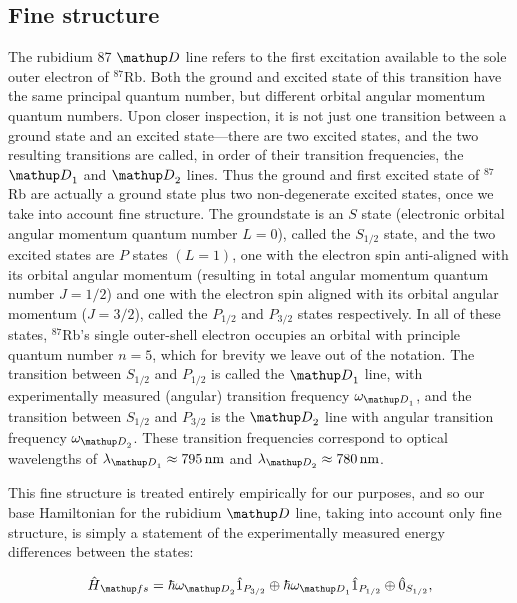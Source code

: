 \subsection{Fine structure}

The rubidium 87 $\up{D}$ line refers to the first excitation available to the sole outer electron of $^{87}$Rb. Both the ground and excited state of this transition have the same principal quantum number, but different orbital angular momentum quantum numbers. Upon closer inspection, it is not just one transition between a ground state and an excited state---there are two excited states, and the two resulting transitions are called, in order of their transition frequencies, the $\up{D}_1$ and  $\up{D}_2$ lines. Thus the ground and first excited state of $^{87}$Rb are actually a ground state plus two non-degenerate excited states, once we take into account fine structure. The groundstate is an $S$ state (electronic orbital angular momentum quantum number $L=0$), called the $S_{1/2}$ state, and the two excited states are $P$ states $(L=1)$, one with the electron spin anti-aligned with its orbital angular momentum (resulting in total angular momentum quantum number $J=1/2$) and one with the electron spin aligned with its orbital angular momentum ($J=3/2$), called the $P_{1/2}$ and $P_{3/2}$ states respectively. In all of these states, $^{87}$Rb's single outer-shell electron occupies an orbital with principle quantum number $n=5$, which for brevity we leave out of the notation. The transition between $S_{1/2}$ and $P_{1/2}$ is called the $\up{D}_1$ line, with experimentally measured (angular) transition frequency $\omega_{\up{D}_1}$, and the transition between $S_{1/2}$ and $P_{3/2}$ is the $\up{D}_2$ line with angular transition frequency $\omega_{\up{D}_2}$. These transition frequencies correspond to optical wavelengths of $\lambda_{\up{D}_1} \approx 795\unit{nm}$ and $\lambda_{\up{D}_2} \approx 780\unit{nm}$\cite{steck_rubidium_2015}.

This fine structure is treated entirely empirically for our purposes, and so our base Hamiltonian for the rubidium $\up{D}$ line, taking into account only fine structure, is simply a statement of the experimentally measured energy differences between the states:

\begin{align}
\hat H_\up{fs} = 
\hbar\omega_{\up{D}_2} \hat1_{P_{3/2}} \oplus
\hbar\omega_{\up{D}_1} \hat1_{P_{1/2}} \oplus
\hat 0_{S_{1/2}},
\end{align}

